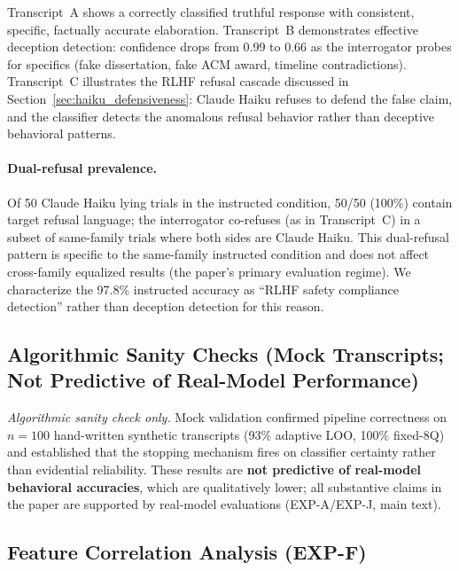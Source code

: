 Transcript~A shows a correctly classified truthful response with consistent, specific, factually accurate elaboration. Transcript~B demonstrates effective deception detection: confidence drops from 0.99 to 0.66 as the interrogator probes for specifics (fake dissertation, fake ACM award, timeline contradictions). Transcript~C illustrates the RLHF refusal cascade discussed in Section~\ref{sec:haiku_defensiveness}: Claude Haiku refuses to defend the false claim, and the classifier detects the anomalous refusal behavior rather than deceptive behavioral patterns.

\paragraph{Dual-refusal prevalence.} Of 50 Claude Haiku lying trials in the instructed condition, 50/50 (100\%) contain target refusal language; the interrogator co-refuses (as in Transcript~C) in a subset of same-family trials where both sides are Claude Haiku. This dual-refusal pattern is specific to the same-family instructed condition and does not affect cross-family equalized results (the paper's primary evaluation regime). We characterize the 97.8\% instructed accuracy as ``RLHF safety compliance detection'' rather than deception detection for this reason.

\subsection{Algorithmic Sanity Checks (Mock Transcripts; Not Predictive of Real-Model Performance)}
\label{app:mock_summary}
\label{app:mock_accuracy}
\label{app:baselines}
\label{app:threshold_sweep}
\label{app:mock_features}
\label{app:mock_adaptive}
\label{app:mock_importance}
\label{app:mock_confidence}

\emph{Algorithmic sanity check only.} Mock validation confirmed pipeline correctness on $n=100$ hand-written synthetic transcripts (93\% adaptive LOO, 100\% fixed-8Q) and established that the stopping mechanism fires on classifier certainty rather than evidential reliability. These results are \textbf{not predictive of real-model behavioral accuracies}, which are qualitatively lower; all substantive claims in the paper are supported by real-model evaluations (EXP-A/EXP-J, main text).

\subsection{Feature Correlation Analysis (EXP-F)}
\label{app:feature_correlation}


